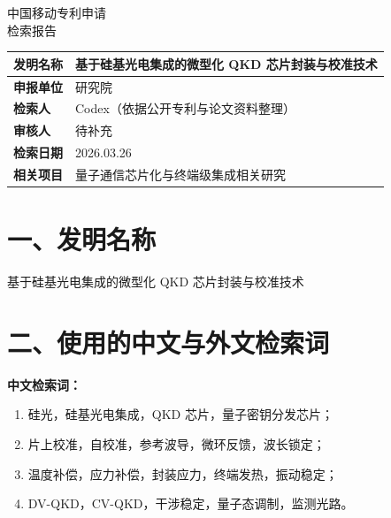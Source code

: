 \documentclass[12pt,a4paper]{article}
\begin{document}
\begin{center}
    {\Huge\heiti 中国移动专利申请} \\[0.5em]
    {\Huge\heiti 检索报告} \\[1em]
\end{center}

\begin{table}[h]
    \centering
    \renewcommand{\arraystretch}{1.8}
    \begin{tabular}{|p{3cm}|p{12cm}|}
        \hline
        \textbf{发明名称} & 基于硅基光电集成的微型化 QKD 芯片封装与校准技术 \\
        \hline
        \textbf{申报单位} & 研究院 \\
        \hline
        \textbf{检索人} & Codex（依据公开专利与论文资料整理） \\
        \hline
        \textbf{审核人} & 待补充 \\
        \hline
        \textbf{检索日期} & 2026.03.26 \\
        \hline
        \textbf{相关项目} & 量子通信芯片化与终端级集成相关研究 \\
        \hline
    \end{tabular}
\end{table}

\noindent{}

\section*{一、发明名称}

基于硅基光电集成的微型化 QKD 芯片封装与校准技术

\section*{二、使用的中文与外文检索词}

\textbf{中文检索词：}
\begin{enumerate}[label=(\arabic*)]
    \item 硅光，硅基光电集成，QKD 芯片，量子密钥分发芯片；
    \item 片上校准，自校准，参考波导，微环反馈，波长锁定；
    \item 温度补偿，应力补偿，封装应力，终端发热，振动稳定；
    \item DV-QKD，CV-QKD，干涉稳定，量子态调制，监测光路。
\end{enumerate}
\end{document}
